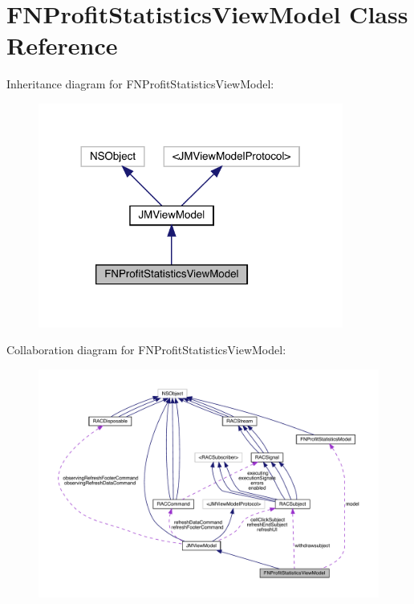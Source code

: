 \hypertarget{interface_f_n_profit_statistics_view_model}{}\section{F\+N\+Profit\+Statistics\+View\+Model Class Reference}
\label{interface_f_n_profit_statistics_view_model}


Inheritance diagram for F\+N\+Profit\+Statistics\+View\+Model\+:\nopagebreak
\begin{figure}[H]
\begin{center}
\leavevmode
\includegraphics[width=284pt]{interface_f_n_profit_statistics_view_model__inherit__graph}
\end{center}
\end{figure}


Collaboration diagram for F\+N\+Profit\+Statistics\+View\+Model\+:\nopagebreak
\begin{figure}[H]
\begin{center}
\leavevmode
\includegraphics[width=350pt]{interface_f_n_profit_statistics_view_model__coll__graph}
\end{center}
\end{figure}
